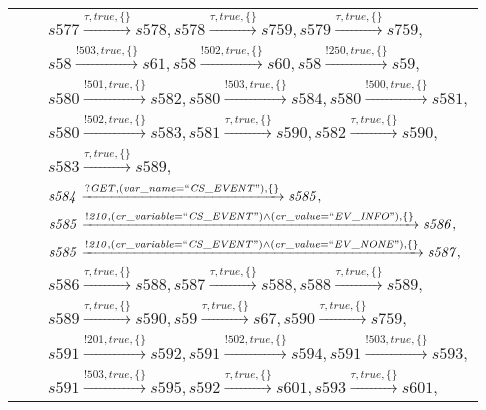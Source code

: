 \begin{tabular}{lcl}
& & $\mathit{s577}\xrightarrow{\mathit{\tau}, \mathit{true}, \{\}}\mathit{s578},\mathit{s578}\xrightarrow{\mathit{\tau}, \mathit{true}, \{\}}\mathit{s759},\mathit{s579}\xrightarrow{\mathit{\tau}, \mathit{true}, \{\}}\mathit{s759},$ \\
& & $\mathit{s58}\xrightarrow{\mathit{!503}, \mathit{true}, \{\}}\mathit{s61},\mathit{s58}\xrightarrow{\mathit{!502}, \mathit{true}, \{\}}\mathit{s60},\mathit{s58}\xrightarrow{\mathit{!250}, \mathit{true}, \{\}}\mathit{s59},$ \\
& & $\mathit{s580}\xrightarrow{\mathit{!501}, \mathit{true}, \{\}}\mathit{s582},\mathit{s580}\xrightarrow{\mathit{!503}, \mathit{true}, \{\}}\mathit{s584},\mathit{s580}\xrightarrow{\mathit{!500}, \mathit{true}, \{\}}\mathit{s581},$ \\
& & $\mathit{s580}\xrightarrow{\mathit{!502}, \mathit{true}, \{\}}\mathit{s583},\mathit{s581}\xrightarrow{\mathit{\tau}, \mathit{true}, \{\}}\mathit{s590},\mathit{s582}\xrightarrow{\mathit{\tau}, \mathit{true}, \{\}}\mathit{s590},$ \\
& & $\mathit{s583}\xrightarrow{\mathit{\tau}, \mathit{true}, \{\}}\mathit{s589},$ \\
& & $\mathit{s584}\xrightarrow{\mathit{?GET}, \mathit{(var\_name = ``CS\_EVENT")}, \{\}}\mathit{s585},$ \\
& & $\mathit{s585}\xrightarrow{\mathit{!210}, \mathit{(cr\_variable = ``CS\_EVENT") \land (cr\_value = ``EV\_INFO")}, \{\}}\mathit{s586},$ \\
& & $\mathit{s585}\xrightarrow{\mathit{!210}, \mathit{(cr\_variable = ``CS\_EVENT") \land (cr\_value = ``EV\_NONE")}, \{\}}\mathit{s587},$ \\
& & $\mathit{s586}\xrightarrow{\mathit{\tau}, \mathit{true}, \{\}}\mathit{s588},\mathit{s587}\xrightarrow{\mathit{\tau}, \mathit{true}, \{\}}\mathit{s588},\mathit{s588}\xrightarrow{\mathit{\tau}, \mathit{true}, \{\}}\mathit{s589},$ \\
& & $\mathit{s589}\xrightarrow{\mathit{\tau}, \mathit{true}, \{\}}\mathit{s590},\mathit{s59}\xrightarrow{\mathit{\tau}, \mathit{true}, \{\}}\mathit{s67},\mathit{s590}\xrightarrow{\mathit{\tau}, \mathit{true}, \{\}}\mathit{s759},$ \\
& & $\mathit{s591}\xrightarrow{\mathit{!201}, \mathit{true}, \{\}}\mathit{s592},\mathit{s591}\xrightarrow{\mathit{!502}, \mathit{true}, \{\}}\mathit{s594},\mathit{s591}\xrightarrow{\mathit{!503}, \mathit{true}, \{\}}\mathit{s593},$ \\
& & $\mathit{s591}\xrightarrow{\mathit{!503}, \mathit{true}, \{\}}\mathit{s595},\mathit{s592}\xrightarrow{\mathit{\tau}, \mathit{true}, \{\}}\mathit{s601},\mathit{s593}\xrightarrow{\mathit{\tau}, \mathit{true}, \{\}}\mathit{s601},$ \\

\end{tabular}
